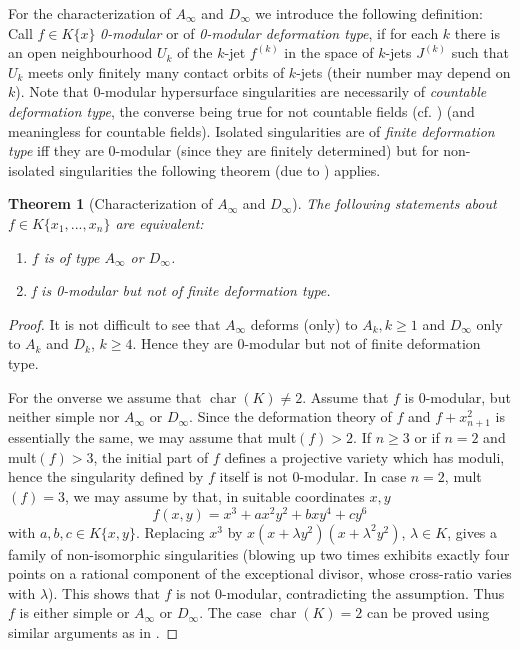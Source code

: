 \documentclass[11pt]{article}
\DeclareMathOperator{\Char}{char}
\newtheorem{Theorem}[Definition]{Theorem}
\begin{document}
For the characterization of  $A_\infty$
and $D_\infty$ we introduce the following definition:
 Call $f\in K\{x\}$ {\it 0-modular}  or of {\it 0-modular deformation type}, if for each $k$ there is an open neighbourhood $U_k$ of the $k$-jet $f^{(k)}$ in  the space of $k$-jets $J^{(k)}$ such that $U_k$ meets only finitely many contact orbits of $k$-jets (their number may depend on $k$). Note that 0-modular hypersurface singularities are necessarily of {\em countable deformation type}, the converse being true for not countable fields (cf.  \cite[Theorem B]{BGS87}) (and meaningless for countable fields).
 Isolated singularities are of {\em finite deformation type} iff they are 0-modular (since they are finitely determined) but for non-isolated singularities the following theorem (due to \cite[Theorem 1.6]{GrKr90}) applies.

\begin{Theorem}[Characterization of $A_\infty$ and $D_\infty$] \label{AD-infty}
The following statements about $f\in K\{x_1,..., x_n\}$ are equivalent: 
\begin {enumerate}
\item $f$ is of type $A_\infty$ or $D_\infty$.
\item f is 0-modular but not of finite deformation type.
\end {enumerate}
\end{Theorem}

\begin{proof} It is not difficult to see that $A_\infty$ deforms  (only) to $A_k, k\ge 1$ and $D_\infty$ only to $A_k$ and $D_k$, $k\ge 4$. Hence  they are 0-modular but not of finite  deformation type. 

For the onverse we assume that $\Char(K) \ne 2$. Assume that $f$ is 0-modular, but neither simple nor $A_\infty$ or $D_\infty$.  Since the deformation theory of $f$ and $f+ x_{n+1}^2$ is essentially the same, we may assume that mult$(f)>2$. 
If $n \ge 3$ or if $n=2$ and mult$(f)>3$, the initial part of $f$ defines a projective variety which has moduli, hence the singularity defined by $f$ itself is not 0-modular. In case $n=2$, mult$(f)=3$, we may assume by \cite[Lemma 3.4]{BGS87} that, in suitable coordinates 
$x, y$
$$f(x, y)=x^3+ax^2y^2+bxy^4 +cy^6$$
with $a, b, c \in K\{x, y\}$. Replacing $x^3$ by 
$x(x+ \lambda y^2)(x+\lambda^2y^2)$, $\lambda \in K$, gives a family of non-isomorphic singularities (blowing up two times exhibits exactly four points on a rational component of the exceptional divisor, whose cross-ratio varies with $\lambda$). This shows that $f$ is not 0-modular, contradicting the assumption. Thus $f$ is either simple or $A_\infty$ or $D_\infty$.
The case $\Char(K) = 2$ can be proved using similar arguments as in \cite[Section 3.5]{GrKr90}.
\end{proof}
\end{document}
